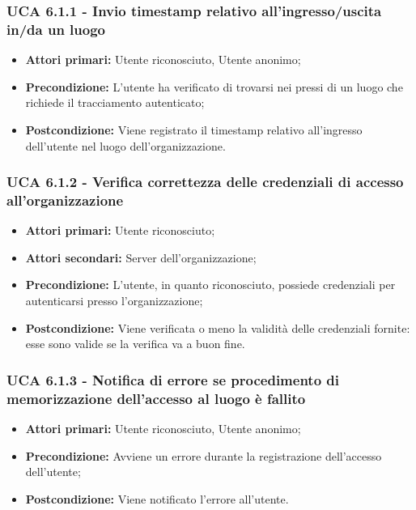 \subsubsection{UCA 6.1.1 - Invio timestamp relativo all'ingresso/uscita in/da un luogo}%
\begin{itemize}
	\item \textbf{Attori primari:} Utente riconosciuto, Utente anonimo;
	\item \textbf{Precondizione:} L'utente ha verificato di trovarsi nei pressi di un luogo che richiede il tracciamento autenticato;
	\item \textbf{Postcondizione:} Viene registrato il timestamp relativo all'ingresso dell'utente nel luogo dell'organizzazione.
\end{itemize}

\subsubsection{UCA 6.1.2 - Verifica correttezza delle credenziali di accesso all'organizzazione}%
\begin{itemize}
	\item \textbf{Attori primari:} Utente riconosciuto;
	\item \textbf{Attori secondari:} Server  dell'organizzazione;
	\item \textbf{Precondizione:} L'utente, in quanto riconosciuto, possiede credenziali per autenticarsi presso l'organizzazione;
	\item \textbf{Postcondizione:} Viene verificata o meno la validità delle credenziali fornite: esse sono valide se la verifica va a buon fine.
\end{itemize}

\subsubsection{UCA 6.1.3 - Notifica di errore se procedimento di memorizzazione dell'accesso al luogo è fallito}%
\begin{itemize}
	\item \textbf{Attori primari:} Utente riconosciuto, Utente anonimo;
	\item \textbf{Precondizione:} Avviene un errore durante la registrazione dell'accesso dell'utente;
	\item \textbf{Postcondizione:} Viene notificato l'errore all'utente.
\end{itemize}

